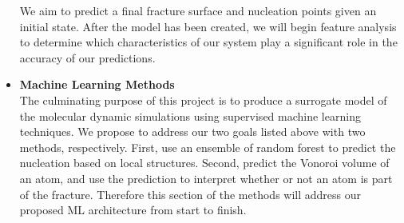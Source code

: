 \begin{itemize}
 We aim to predict a final fracture surface and nucleation points given an initial state. After the model has been created, we will begin feature analysis to determine which characteristics of our system play a significant role in the accuracy of our predictions.
\\

\item \textbf{Machine Learning Methods}
\bigskip
\\
The culminating purpose of this project is to produce a surrogate model of the molecular dynamic simulations using supervised machine learning techniques. We propose to address our two goals listed above with two methods, respectively. First, use an ensemble of random forest to predict the nucleation based on local structures. Second, predict the Vonoroi volume of an atom, and use the prediction to interpret whether or not an atom is part of the fracture. Therefore this section of the methods will address our proposed ML architecture from start to finish.



\end{itemize}
